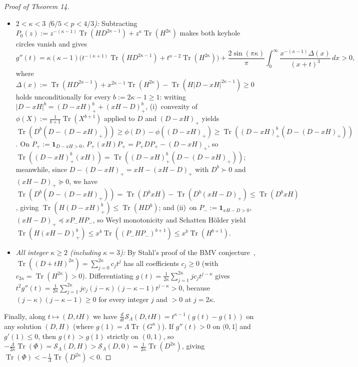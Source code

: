 \documentclass[10pt,letterpaper]{article}
\newcommand{\Tr}{\operatorname{Tr}}
\begin{document}
\begin{proof}[Proof of Theorem 14]
\begin{itemize}[leftmargin=1.5em,itemsep=1.5pt]
  \[
    g''(t) = \frac{2|\sin(\pi\kappa)|}{\pi}\int_0^\infty \frac{x^{-(\kappa - 1)}\Tr\bigl(H|D - xH|^{2\kappa - 1}\bigr)}{(x + t)^3}\,dx > 0.
  \]
  \item \emph{$2 < \kappa < 3$ ($6/5 < p < 4/3$):} Subtracting $P_0(z) := z^{-(\kappa-1)}\Tr(HD^{2\kappa-1}) + z^\kappa\Tr(H^{2\kappa})$ makes both keyhole circles vanish and gives
  \[
    g''(t) = \kappa(\kappa-1)\bigl(t^{-(\kappa+1)}\Tr(HD^{2\kappa-1}) + t^{\kappa-2}\Tr(H^{2\kappa})\bigr) + \frac{2\sin(\pi\kappa)}{\pi}\int_0^\infty \frac{x^{-(\kappa-1)}\Delta(x)}{(x+t)^3}\,dx > 0,
  \]
  where $\Delta(x) := \Tr(HD^{2\kappa-1}) + x^{2\kappa-1}\Tr(H^{2\kappa}) - \Tr(H|D-xH|^{2\kappa-1}) \ge 0$ holds unconditionally for every $b := 2\kappa - 1 \ge 1$: writing $|D-xH|^b = (D-xH)_+^b + (xH-D)_+^b$, (i)~convexity of $\phi(X) := \frac{1}{b+1}\Tr(X^{b+1})$ applied to $D$ and $(D-xH)_+$ yields $\Tr(D^b(D-(D-xH)_+)) \ge \phi(D) - \phi((D-xH)_+) \ge \Tr((D-xH)_+^b(D-(D-xH)_+))$. On $P_+ := \mathbf{1}_{D-xH>0}$, $P_+(xH)P_+ = P_+ D P_+ - (D-xH)_+$, so $\Tr((D-xH)_+^b(xH)) = \Tr((D-xH)_+^b(D-(D-xH)_+))$; meanwhile, since $D - (D-xH)_+ = xH - (xH-D)_+$ with $D^b \succ 0$ and $(xH-D)_+ \succeq 0$, we have $\Tr(D^b(D-(D-xH)_+)) = \Tr(D^b xH) - \Tr(D^b(xH-D)_+) \le \Tr(D^b xH)$, giving $\Tr(H(D-xH)_+^b) \le \Tr(HD^b)$; and (ii)~on $P_- := \mathbf{1}_{xH-D>0}$, $(xH-D)_+ \preceq x P_- H P_-$, so Weyl monotonicity and Schatten H\"older yield $\Tr(H(xH-D)_+^b) \le x^b\Tr((P_- H P_-)^{b+1}) \le x^b\Tr(H^{b+1})$.
  \item \emph{All integer $\kappa \ge 2$ (including $\kappa = 3$):} By Stahl's proof of the BMV conjecture~\cite{Stahl2013}, $\Tr((D+tH)^{2\kappa}) = \sum_{j=0}^{2\kappa} c_j t^j$ has all coefficients $c_j \ge 0$ (with $c_{2\kappa} = \Tr(H^{2\kappa}) > 0$). Differentiating $g(t) = \frac{1}{2\kappa}\sum_{j=1}^{2\kappa} j c_j t^{j-\kappa}$ gives $t^2 g''(t) = \frac{1}{2\kappa}\sum_{j=1}^{2\kappa} j c_j(j-\kappa)(j-\kappa-1) t^{j-\kappa} > 0$, because $(j-\kappa)(j-\kappa-1) \ge 0$ for every integer $j$ and $> 0$ at $j = 2\kappa$.
\end{itemize}
Finally, along $t \mapsto (D, tH)$ we have $\frac{d}{dt}\mathcal{S}_\Lambda(D, tH) = t^{\kappa-1}(g(t) - g(1))$ on any solution $(D, H)$ (where $g(1) = \Lambda\Tr(G^\kappa)$). If $g''(t) > 0$ on $(0, 1]$ and $g'(1) \le 0$, then $g(t) > g(1)$ strictly on $(0, 1)$, so $-\frac{\Lambda}{2\kappa}\Tr(\Phi) = \mathcal{S}_\Lambda(D, H) > \mathcal{S}_\Lambda(D, 0) = \frac{1}{2\kappa}\Tr(D^{2\kappa})$, giving $\Tr(\Phi) < -\frac{1}{\Lambda}\Tr(D^{2\kappa}) < 0$.


\end{proof}
\end{document}
